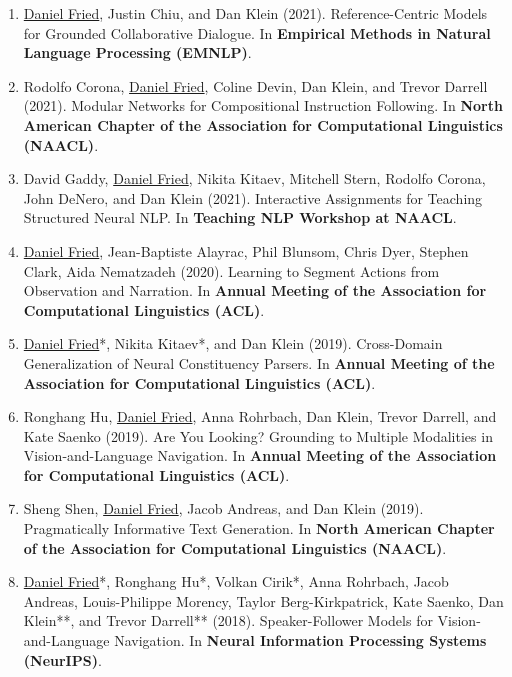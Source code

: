 \begin{enumerate}[leftmargin=-1mm,partopsep=0pt]
\item \underline{Daniel Fried}, Justin Chiu, and Dan Klein (2021). Reference-Centric Models for Grounded Collaborative Dialogue. In \textbf{Empirical Methods in Natural Language Processing (EMNLP)}.

\item Rodolfo Corona, \underline{Daniel Fried}, Coline Devin, Dan Klein, and Trevor Darrell (2021). Modular Networks for Compositional Instruction Following. In \textbf{North American Chapter of the Association for Computational Linguistics (NAACL)}.

\item David Gaddy, \underline{Daniel Fried}, Nikita Kitaev, Mitchell Stern, Rodolfo Corona, John DeNero, and Dan Klein (2021). Interactive Assignments for Teaching Structured Neural NLP. In \textbf{Teaching NLP Workshop at NAACL}.

\item \underline{Daniel Fried}, Jean-Baptiste Alayrac, Phil Blunsom, Chris Dyer, Stephen Clark, Aida Nematzadeh (2020). Learning to Segment Actions from Observation and Narration. In \textbf{Annual Meeting of the Association for Computational Linguistics (ACL)}.

\item \underline{Daniel Fried}*, Nikita Kitaev*, and Dan Klein (2019). Cross-Domain Generalization of Neural Constituency Parsers. In \textbf{Annual Meeting of the Association for Computational Linguistics (ACL)}.

\item Ronghang Hu, \underline{Daniel Fried}, Anna Rohrbach, Dan Klein, Trevor Darrell, and Kate Saenko (2019). Are You Looking? Grounding to Multiple Modalities in Vision-and-Language Navigation. In \textbf{Annual Meeting of the Association for Computational Linguistics (ACL)}.

\item Sheng Shen, \underline{Daniel Fried}, Jacob Andreas, and Dan Klein (2019). Pragmatically Informative Text Generation. In \textbf{North American Chapter of the Association for Computational Linguistics (NAACL)}.

\item \underline{Daniel Fried}*, Ronghang Hu*, Volkan Cirik*, Anna Rohrbach, Jacob Andreas, Louis-Philippe Morency, Taylor Berg-Kirkpatrick, Kate Saenko, Dan Klein**, and Trevor Darrell**  (2018). Speaker-Follower Models for Vision-and-Language Navigation. In \textbf{Neural Information Processing Systems (NeurIPS)}.


\end{enumerate}
